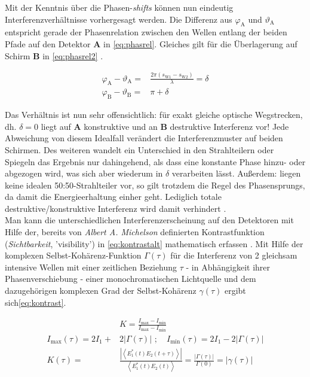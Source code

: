 \documentclass[numbers=noenddot,a4paper,notitlepage,twoside,BCOR15mm]{scrartcl}
\newcommand{\ix}[1]{_\text{#1}}
\newcommand{\tilt}[1]{\textit{#1}}
\newcommand{\fett}[1]{\textbf{#1}}
\begin{document}
			Mit der Kenntnis über die Phasen-\tilt{shifts} können nun eindeutig Interferenzverhältnisse vorhergesagt werden. Die Differenz aus $\varphi\ix{A}$ und $\vartheta\ix{A}$ entspricht gerade der Phasenrelation zwischen den Wellen entlang der beiden Pfade auf den Detektor \fett{A} in \autoref{eq:phasrel}. Gleiches gilt für die Überlagerung auf Schirm \fett{B} in \autoref{eq:phasrel2} \cite{MZwork}.

				\begin{align}
					\varphi\ix{A}-\vartheta\ix{A}=&\frac{2\pi (s\ix{W1}-s\ix{W2})}{\lambda}=\delta \label{eq:phasrel}\\
					\varphi\ix{B}-\vartheta\ix{B}=&\pi+\delta \label{eq:phasrel2}
				\end{align}

			Das Verhältnis ist nun sehr offensichtlich: für exakt gleiche optische Wegstrecken, dh. $\delta=0$ liegt auf \fett{A} konstruktive und an \fett{B} destruktive Interferenz vor! Jede Abweichung von diesem Idealfall verändert die Interferenzmuster auf beiden Schirmen. Des weiteren wandelt ein Unterschied in den Strahlteilern oder Spiegeln das Ergebnis nur dahingehend, als dass eine konstante Phase hinzu- oder abgezogen wird, was sich aber wiederum in $\delta$ verarbeiten lässt. Außerdem: liegen keine idealen 50:50-Strahlteiler vor, so gilt trotzdem die Regel des Phasensprungs, da damit die Energieerhaltung einher geht. Lediglich totale destruktive/konstruktive Interferenz wird damit verhindert \cite{MZwork}.\\
			Man kann die unterschiedlichen Interferenzerscheinung auf den Detektoren mit Hilfe der, bereits von \tilt{Albert A. Michelson} definierten Kontrastfunktion (\tilt{Sichtbarkeit}, 'visibility') in \autoref{eq:kontrastalt} mathematisch erfassen \cite{MZcohe}. Mit Hilfe der komplexen Selbst-Kohärenz-Funktion $\Gamma(\tau)$ für die Interferenz von 2 gleichsam intensive Wellen mit einer zeitlichen Beziehung $\tau$ - in Abhängigkeit ihrer Phasenverschiebung - einer monochromatischen Lichtquelle und dem dazugehörigen komplexen Grad der Selbst-Kohärenz $\gamma(\tau)$ ergibt sich\autoref{eq:kontrast}.

				\begin{align}
					&K=\frac{I\ix{max}-I\ix{min}}{I\ix{max}-I\ix{min}} \label{eq:kontrastalt} \\
					I\ix{max}(\tau)=2I\ix{1}+&2|\Gamma(\tau)| \,\, ;\quad I\ix{min}(\tau)=2I\ix{1}-2|\Gamma(\tau)| \nonumber \\
					K(\tau)=&\frac{|\left\langle E^*\ix{1}(t)E\ix{2}(t+\tau)\right\rangle|}{\left\langle E^*\ix{1}(t)E\ix{2}(t)\right\rangle}=\frac{|\Gamma(\tau)|}{\Gamma(0)}=|\gamma(\tau)| \label{eq:kontrast}
				\end{align}
\end{document}
